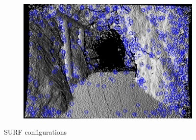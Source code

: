 \begin{figure}[H]
\begin{subfigure}[t]{0.25\linewidth}
\end{subfigure}%
\begin{subfigure}[t]{0.25\linewidth}
    \includegraphics[width=\linewidth]{chapter06/results/SURF/bearing/oneoctave_kp0005.png}%
\end{subfigure}%
\caption{SURF configurations}
\end{figure}

